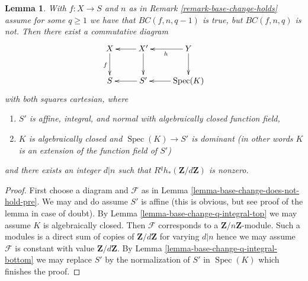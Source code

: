 \documentclass[10pt,a4paper]{amsart}
\theoremstyle{plain}
\newtheorem{lemma}[subsection]{Lemma}
\theoremstyle{definition}
\theoremstyle{remark}
\numberwithin{equation}{subsection}
\def\Spec{\mathop{\mathrm{Spec}}}
\begin{document}
\begin{lemma}
\label{lemma-base-change-does-not-hold}
With $f : X \to S$ and $n$ as in Remark \ref{remark-base-change-holds}
assume for some $q \geq 1$ we have that
$BC(f, n, q - 1)$ is true, but $BC(f, n, q)$ is not.
Then there exist a commutative diagram
$$
\xymatrix{
X \ar[d]_f & X' \ar[d] \ar[l] & Y \ar[l]^h \ar[d] \\
S & S' \ar[l] & \Spec(K) \ar[l]
}
$$
with both squares cartesian, where
\begin{enumerate}
\item $S'$ is affine, integral, and normal with algebraically
closed function field,
\item $K$ is algebraically closed and $\Spec(K) \to S'$
is dominant (in other words $K$ is an extension of
the function field of $S'$)
\end{enumerate}
and there exists an integer $d | n$
such that $R^qh_*(\mathbf{Z}/d\mathbf{Z})$ is nonzero.
\end{lemma}

\begin{proof}
First choose a diagram and $\mathcal{F}$ as in
Lemma \ref{lemma-base-change-does-not-hold-pre}.
We may and do assume $S'$ is affine (this is obvious, but
see proof of the lemma in case of doubt).
By Lemma \ref{lemma-base-change-q-integral-top}
we may assume $K$ is algebraically closed.
Then $\mathcal{F}$ corresponds to a $\mathbf{Z}/n\mathbf{Z}$-module.
Such a modules is a direct sum of copies of $\mathbf{Z}/d\mathbf{Z}$
for varying $d | n$ hence we may assume $\mathcal{F}$ is
constant with value $\mathbf{Z}/d\mathbf{Z}$.
By Lemma \ref{lemma-base-change-q-integral-bottom}
we may replace $S'$ by the normalization
of $S'$ in $\Spec(K)$ which finishes the proof.
\end{proof}
\end{document}
